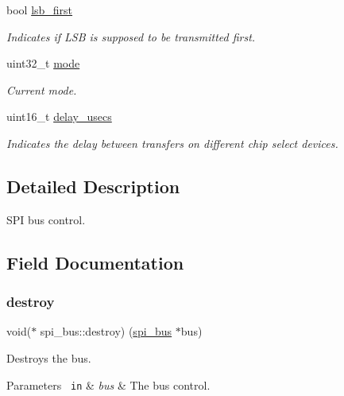 \begin{DoxyCompactItemize}
bool \mbox{\hyperlink{structspi__bus_a64db0fe4b0d24a648c80c184870903be}{lsb\+\_\+first}}
\begin{DoxyCompactList}\small\item\em Indicates if L\+SB is supposed to be transmitted first. \end{DoxyCompactList}\item 
\mbox{\label{structspi__bus_a37cc2398edee0569bffa8e4dc099e12b}} 
uint32\+\_\+t \mbox{\hyperlink{structspi__bus_a37cc2398edee0569bffa8e4dc099e12b}{mode}}
\begin{DoxyCompactList}\small\item\em Current mode. \end{DoxyCompactList}\item 
\mbox{\label{structspi__bus_a5120694a54759d14d9ccd67e2ed5d6d6}} 
uint16\+\_\+t \mbox{\hyperlink{structspi__bus_a5120694a54759d14d9ccd67e2ed5d6d6}{delay\+\_\+usecs}}
\begin{DoxyCompactList}\small\item\em Indicates the delay between transfers on different chip select devices. \end{DoxyCompactList}\end{DoxyCompactItemize}


\subsection{Detailed Description}
S\+PI bus control. 

\subsection{Field Documentation}
\mbox{\label{structspi__bus_a2fb539efa059a61f3f5f258dbd53f74e}} 
\subsubsection{\texorpdfstring{destroy}{destroy}}
{\footnotesize\ttfamily void($\ast$ spi\+\_\+bus\+::destroy) (\mbox{\hyperlink{structspi__bus}{spi\+\_\+bus}} $\ast$bus)}



Destroys the bus. 


\begin{DoxyParams}[1]{Parameters}
\mbox{\texttt{ in}}  & {\em bus} & The bus control. \\
\hline
\end{DoxyParams}
\mbox{\label{structspi__bus_a73816e06bde44fbbf31b238fedc4c6d2}} 
